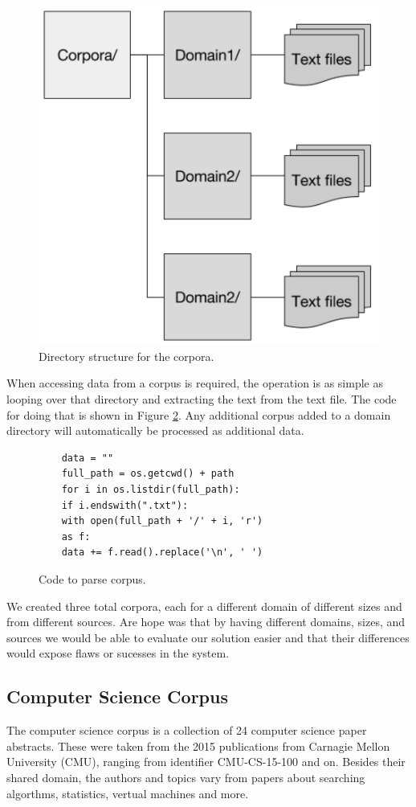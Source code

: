 \documentclass[letterpaper, 10 pt, conference]{ieeeconf}  %
\begin{document}
\begin{figure}[!ht]
	\centering
	\includegraphics[width=.4\textwidth]{filestruct}
	\caption{Directory structure for the corpora.}
	\label{fig:Directorystructure}
\end{figure}

When accessing data from a corpus is required, the operation is as simple as looping over that directory and extracting the text from the text file. The code for doing that is shown in Figure \ref{fig:Codeparse}. Any additional corpus added to a domain directory will automatically be processed as additional data.

\begin{figure}[!ht]
	\begin{verbatim}
	data = ""
	full_path = os.getcwd() + path
	for i in os.listdir(full_path):
	if i.endswith(".txt"):
	with open(full_path + '/' + i, 'r')
	as f:
	data += f.read().replace('\n', ' ')
	\end{verbatim}

	\caption{Code to parse corpus.}
	\label{fig:Codeparse}
\end{figure}

We created three total corpora, each for a different domain of different sizes and from different sources. Are hope was that by having different domains, sizes, and sources we would be able to evaluate our solution easier and that their differences would expose flaws or sucesses in the system.

\subsection{Computer Science Corpus}

The computer science corpus is a collection of 24 computer science paper abstracts. These were taken from the 2015 publications from Carnagie Mellon University (CMU), ranging from identifier CMU-CS-15-100 and on. Besides their shared domain, the authors and topics vary from papers about searching algorthms, statistics, vertual machines and more.
\end{document}
